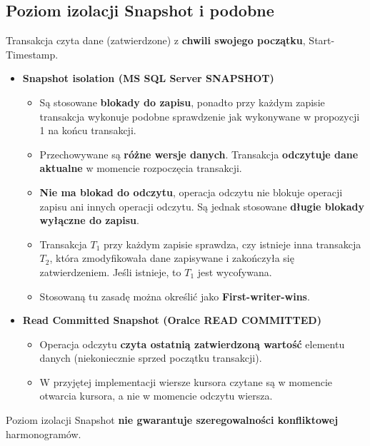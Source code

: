 \documentclass[a4paper]{article}
\begin{document}
    \subsection{Poziom izolacji Snapshot i podobne}
    Transakcja czyta dane (zatwierdzone) z \textbf{chwili swojego
    początku}, Start-Timestamp. \\

    \begin{itemize}[noitemsep]
        \item \textbf{Snapshot isolation (MS SQL Server SNAPSHOT)}
        \begin{itemize}[noitemsep]
            \item Są stosowane \textbf{blokady do zapisu}, ponadto przy każdym zapisie transakcja wykonuje podobne
            sprawdzenie jak wykonywane w propozycji 1 na końcu transakcji.
            \item Przechowywane są \textbf{różne wersje danych}. Transakcja \textbf{odczytuje dane aktualne} w momencie
            rozpoczęcia transakcji.
            \item \textbf{Nie ma blokad do odczytu}, operacja odczytu nie blokuje operacji zapisu ani innych operacji
            odczytu. Są jednak stosowane \textbf{długie blokady wyłączne do zapisu}.
            \item Transakcja $T_1$ przy każdym zapisie sprawdza, czy istnieje inna transakcja $T_2$, która zmodyfikowała
            dane zapisywane i zakończyła się zatwierdzeniem. Jeśli istnieje, to $T_1$ jest wycofywana.
            \item Stosowaną tu zasadę można określić jako \textbf{First-writer-wins}.
        \end{itemize}
        \item \textbf{Read Committed Snapshot (Oralce READ COMMITTED)}
        \begin{itemize}[noitemsep]
            \item Operacja odczytu \textbf{czyta ostatnią zatwierdzoną wartość} elementu danych (niekoniecznie sprzed
            początku transakcji).
            \item W przyjętej implementacji wiersze kursora czytane są w momencie otwarcia kursora, a nie w momencie
            odczytu wiersza.
        \end{itemize}
    \end{itemize}

    Poziom izolacji Snapshot \textbf{nie gwarantuje szeregowalności konfliktowej} harmonogramów.\\
\end{document}
